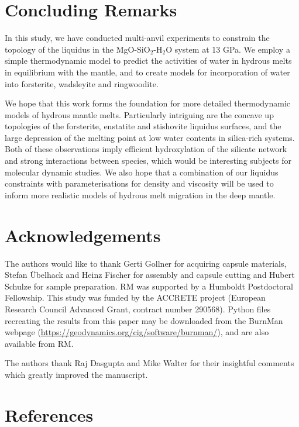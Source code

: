 \documentclass[review]{elsarticle}
\begin{document}
\section{Concluding Remarks}
In this study, we have conducted multi-anvil experiments to constrain the topology of the liquidus in the MgO-SiO$_2$-H$_2$O system at 13 GPa. We employ a simple thermodynamic model to predict the activities of water in hydrous melts in equilibrium with the mantle, and to create models for incorporation of water into forsterite, wadsleyite and ringwoodite. 

We hope that this work forms the foundation for more detailed thermodynamic models of hydrous mantle melts. Particularly intriguing are the concave up topologies of the forsterite, enstatite and stishovite liquidus surfaces, and the large depression of the melting point at low water contents in silica-rich systems. Both of these observations imply efficient hydroxylation of the silicate network and strong interactions between species, which would be interesting subjects for molecular dynamic studies. We also hope that a combination of our liquidus constraints with parameterisations for density and viscosity will be used to inform more realistic models of hydrous melt migration in the deep mantle.


\section{Acknowledgements}
The authors would like to thank Gerti Gollner for acquiring capsule materials, Stefan \"Ubelhack and Heinz Fischer for assembly and capsule cutting and Hubert Schulze for sample preparation. RM was supported by a Humboldt Postdoctoral Fellowship. This study was funded by the ACCRETE project (European Research Council Advanced Grant, contract number 290568). Python files recreating the results from this paper may be downloaded from the BurnMan webpage (\url{https://geodynamics.org/cig/software/burnman/}), and are also available from RM.

The authors thank Raj Dasgupta and Mike Walter for their insightful comments which greatly improved the manuscript.

\clearpage
\section*{References}


\end{document}
